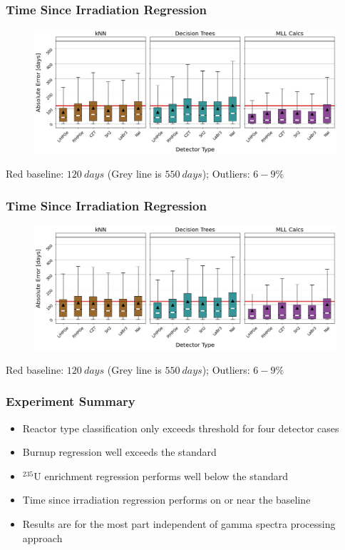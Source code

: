 \begin{frame}
  \frametitle{Time Since Irradiation Regression}
  \begin{adjustwidth}{-15pt}{-10pt}
  \begin{figure}
    \centering
    \includegraphics[width=1.1\textwidth]{./figures/abserror_boxplots_short_cool.png}
  \end{figure}
  \vspace{12pt} \centering Red baseline: $120\:days$ (Grey line is $550\:days$); Outliers: $6-9\%$  
  \end{adjustwidth}
\end{frame}

\begin{frame}
  \frametitle{Time Since Irradiation Regression}
  \begin{adjustwidth}{-15pt}{-10pt}
  \begin{figure}
    \centering
    \includegraphics[width=1.1\textwidth]{./figures/abserror_boxplots_long_cool.png}
  \end{figure}
  \vspace{12pt} \centering Red baseline: $120\:days$ (Grey line is $550\:days$); Outliers: $6-9\%$  
  \end{adjustwidth}
\end{frame}

\begin{frame}
  \frametitle{Experiment Summary}
  \begin{itemize}
    \item Reactor type classification only exceeds threshold for four detector
    cases
    \item Burnup regression well exceeds the standard
    \item ${}^{235}\text{U}$ enrichment regression performs well below the
    standard
    \item Time since irradiation regression performs on or near the baseline
    \item Results are for the most part independent of gamma spectra processing 
    approach
  \end{itemize}
\end{frame}

